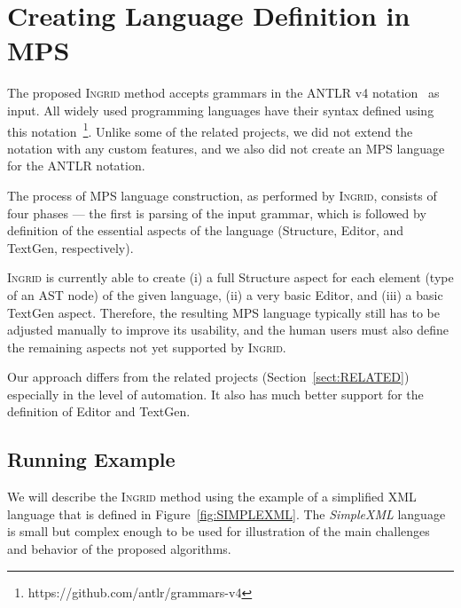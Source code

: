 \section{Creating Language Definition in MPS}
\label{sect:LANGDEF}

The proposed \textsc{Ingrid} method accepts grammars in the ANTLR v4 notation~\cite{ref:ANTLRBOOK} as input.
All widely used programming languages have their syntax defined using this notation~\footnote{https://github.com/antlr/grammars-v4}.
Unlike some of the related projects, we did not extend the notation with any custom features, and we also did not create an MPS language for the ANTLR notation.

The process of MPS language construction, as performed by \textsc{Ingrid}, consists of four phases --- the first is parsing of the input grammar, which is followed by definition of the essential aspects of the language (Structure, Editor, and TextGen, respectively).

\textsc{Ingrid} is currently able to create (i) a full Structure aspect for each element (type of an AST node) of the given language, (ii) a very basic Editor, and (iii) a basic TextGen aspect.
Therefore, the resulting MPS language typically still has to be adjusted manually to improve its usability, and the human users must also define the remaining aspects not yet supported by \textsc{Ingrid}.

Our approach differs from the  related projects (Section~\ref{sect:RELATED}) especially in the level of automation. It also has much better support for the definition of Editor and TextGen.

\subsection{Running Example}

We will describe the \textsc{Ingrid} method using the example of a simplified XML language that is defined in Figure~\ref{fig:SIMPLEXML}.
The \emph{SimpleXML} language is small but complex enough to be used for illustration of the main challenges and behavior of the proposed algorithms.

